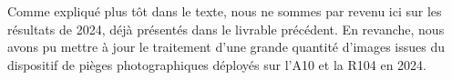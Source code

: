 Comme expliqué plus tôt dans le texte, nous ne sommes par revenu ici sur les résultats de 2024, déjà présentés dans le livrable précédent. En revanche, nous avons pu mettre à jour le traitement d'une grande quantité d'images issues du dispositif de pièges photographiques déployés sur l'A10 et la R104 en 2024. 